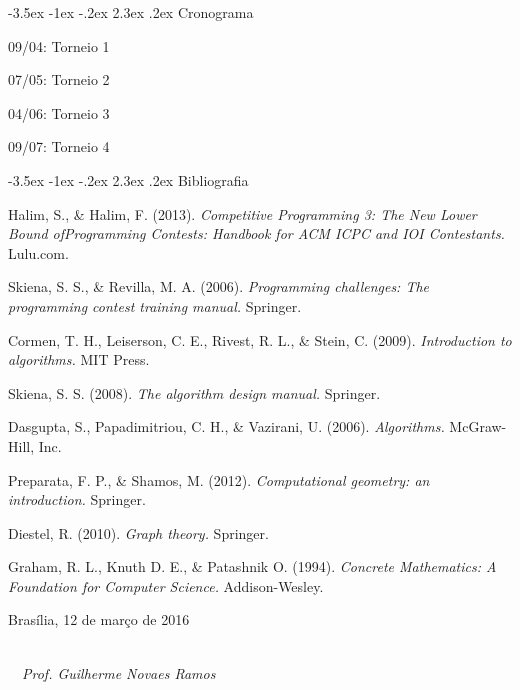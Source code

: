 \documentclass{UnBExam}%
\makeatletter
\newcommand{\dataprimeirodia}{12 de março de 2016}
\newcommand{\nomeprofessor}{Guilherme Novaes Ramos}
\renewcommand\section{\@startsection{section}{1}{\z@}%
	{-3.5ex \@plus -1ex \@minus -.2ex}%
	{2.3ex \@plus.2ex}%
	{\normalfont\normalsize\bfseries}}%
\newenvironment{my_itemize}%
{\begin{itemize}%
  \vspace{-0.3\baselineskip}
  \setlength{\itemsep}{1pt}%
  \setlength{\parskip}{0pt}%
  \setlength{\parsep}{0pt}}%
{\end{itemize}}
\makeatother
\begin{document}
	\section{Cronograma}%
		\begin{my_itemize}
			\item 09/04: Torneio 1
			\item 07/05: Torneio 2
			\item 04/06: Torneio 3
			\item 09/07: Torneio 4
		\end{my_itemize}
\vspace{-0.3cm}	
	\section{Bibliografia}%
		\begin{my_itemize}
		\item Halim, S., \& Halim, F. (2013). \textit{Competitive Programming 3: The New Lower Bound of\break Programming Contests: Handbook for ACM ICPC and IOI Contestants.} Lulu.com.
		\item Skiena, S. S., \& Revilla, M. A. (2006). \textit{Programming challenges: The programming contest training manual.} Springer.
		\item Cormen, T. H., Leiserson, C. E., Rivest, R. L., \& Stein, C. (2009). \textit{Introduction to algorithms.} MIT Press.
		\item Skiena, S. S. (2008). \textit{The algorithm design manual.} Springer.
		\item Dasgupta, S., Papadimitriou, C. H., \& Vazirani, U. (2006). \textit{Algorithms.} McGraw-Hill, Inc.
		\item Preparata, F. P., \& Shamos, M. (2012). \textit{Computational geometry: an introduction.} Springer.
		\item Diestel, R. (2010). \textit{Graph theory.} Springer.
		\item Graham, R. L., Knuth D. E., \& Patashnik O. (1994). \textit{Concrete Mathematics: A Foundation for Computer Science.} Addison-Wesley.
		\end{my_itemize}
	\vspace{.6cm}%
	Brasília, \dataprimeirodia \hfill \parbox[t]{75mm} {\hrulefill\\\ \ \textit{Prof. \nomeprofessor}}
\end{document}
